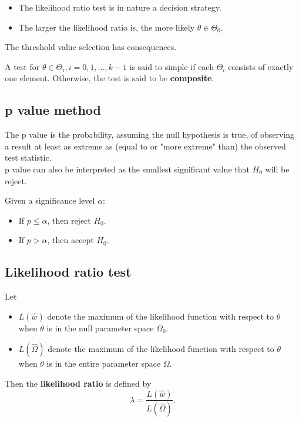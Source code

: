 \begin{refsection}
\begin{remark}\hfill
	\begin{itemize}
		\item The likelihood ratio test is in nature a decision strategy.
		\item 
		The larger the likelihood ratio is, the more likely $\theta \in \Theta_0$.\\
		
	\end{itemize}  
\end{remark}

The threshold value selection has consequences.

\begin{definition}
	A test for $\theta\in \Theta_i,i=0,1,...,k-1$ is said to simple if each $\Theta_i$ consists of exactly one element. Otherwise, the test is said to be \textbf{composite}. 
\end{definition}



\subsection{p value method}
\begin{definition}[p value]
The p value is the probability, assuming the null hypothesis is true, of observing a result at least as extreme as (equal to or "more extreme" than) the observed test statistic. \\
p value can also be interpreted as the smallest significant value that $H_0$ will be reject.
\end{definition}

\begin{remark}
Given a significance level $\alpha$:
\begin{itemize}
	\item If $p \leq \alpha$, then reject $H_0$.
	\item If $p > \alpha$, then accept $H_0$.
\end{itemize} 	
\end{remark}


\subsection{Likelihood ratio test}

\begin{definition}
Let
\begin{itemize}
	\item $L(\hat{w})$ denote the maximum of the likelihood function with respect to $\theta$ when $\theta$ is in the null parameter space $\Omega_0$.
	\item $L(\hat{\Omega})$ denote the maximum of the likelihood function with respect to $\theta$ when $\theta$ is in the entire parameter space $\Omega$. 
\end{itemize}	
Then the \textbf{likelihood ratio} is defined by
$$\lambda = \frac{L(\hat{w})}{L(\hat{\Omega})}.$$


\end{definition}
\end{refsection}
